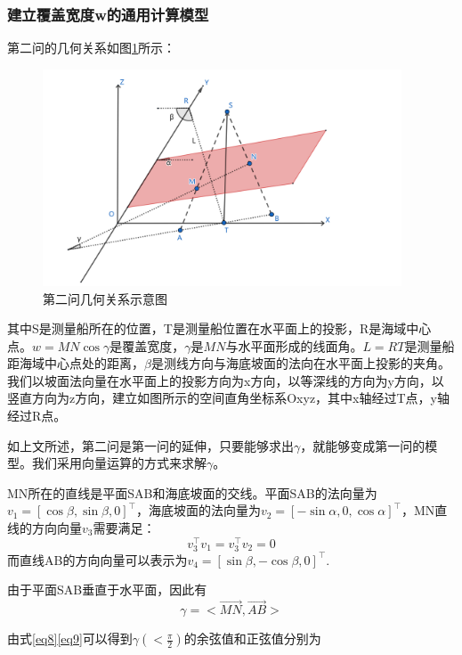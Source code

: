 \documentclass{article}
\begin{document}
\subsubsection{建立覆盖宽度w的通用计算模型}
	\par 第二问的几何关系如图\ref{pro2Geo}所示：
	\begin{figure}[H]
		\centering  %
		\includegraphics[width=0.95\textwidth]{问题二//第二题几何关系示意图}
		\caption{第二问几何关系示意图}
		\label{pro2Geo}
	\end{figure}
	其中S是测量船所在的位置，T是测量船位置在水平面上的投影，R是海域中心点。$w=MN\cos\gamma$是覆盖宽度，$\gamma$是$MN$与水平面形成的线面角。$L=RT$是测量船距海域中心点处的距离，$\beta$是测线方向与海底坡面的法向在水平面上投影的夹角。我们以坡面法向量在水平面上的投影方向为x方向，以等深线的方向为y方向，以竖直方向为z方向，建立如图所示的空间直角坐标系Oxyz，其中x轴经过T点，y轴经过R点。
	\par 如上文所述，第二问是第一问的延伸，只要能够求出$\gamma$，就能够变成第一问的模型。我们采用向量运算的方式来求解$\gamma$。
	\par MN所在的直线是平面SAB和海底坡面的交线。平面SAB的法向量为$v_1=[\cos\beta,\sin\beta,0]^\top$，海底坡面的法向量为$v_2=[-\sin\alpha,0,\cos\alpha]^\top$，MN直线的方向向量$v_3$需要满足：
	\begin{equation}
		v_3^\top v_1 = v_3^\top v_2 = 0  \label{eq8}
	\end{equation}
	而直线AB的方向向量可以表示为$v_4 = [\sin\beta,-\cos\beta,0]^\top$.
	\par 由于平面SAB垂直于水平面，因此有
	\begin{equation}
		\gamma = <\vec{MN},\vec{AB}> \label{eq9}
	\end{equation}
	\par 由式\eqref{eq8}\eqref{eq9}可以得到$\gamma(<\frac{\pi}{2})$的余弦值和正弦值分别为
\end{document}
